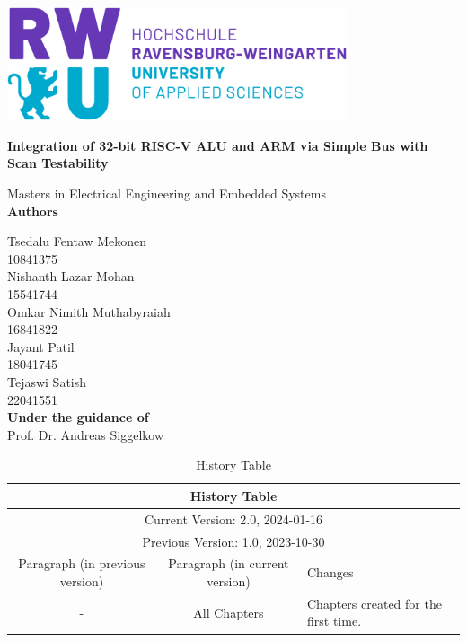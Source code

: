 \documentclass[a4paper,12pt,english]{report}
\begin{document}
\begin{titlepage}
  \centering
  \vspace*{\fill}
  \includegraphics[width=100mm]{Logo rwu.png}\par
  \vspace{1cm}
  \Huge\textbf{Integration of 32-bit RISC-V ALU and ARM via Simple Bus with Scan Testability}\par
  \vspace{1cm}
  \Large{Masters in Electrical Engineering and Embedded Systems}\\
   \vspace{1cm}
  \Large\textbf{Authors}\par
  \Large{Tsedalu Fentaw Mekonen}\\
  \small{10841375}\\
  \Large{Nishanth Lazar Mohan }\\
  \small{15541744}\\
   \Large{Omkar Nimith Muthabyraiah }\\
  \small{16841822}\\       
\Large{Jayant Patil}\\
  \small{18041745}\\ 
 \Large{ Tejaswi Satish }\\
  \small{22041551}\\ 
  \vspace{0.5cm}
  \Large\textbf{Under the guidance of}\\
  \Large{Prof. Dr. Andreas Siggelkow}
  \vspace{0.5cm}
  \vspace*{\fill}
\end{titlepage}

\begin{table}[H]
    \centering
    \begin{tabular}{|c|c|p{3.5cm}|}
        \hline
        \multicolumn{3}{|c|}{\textbf{History Table}}\\
        \hline
        \multicolumn{3}{|c|}{Current Version: 2.0, 2024-01-16}\\
        \multicolumn{3}{|c|}{Previous Version: 1.0, 2023-10-30}\\
        \hline
        Paragraph (in previous version) & Paragraph (in current version) & Changes \\
        \hline
        - & All Chapters & Chapters created for the first time. \\
        \hline
    \end{tabular}
    \caption{History Table}
\end{table}
\end{document}
